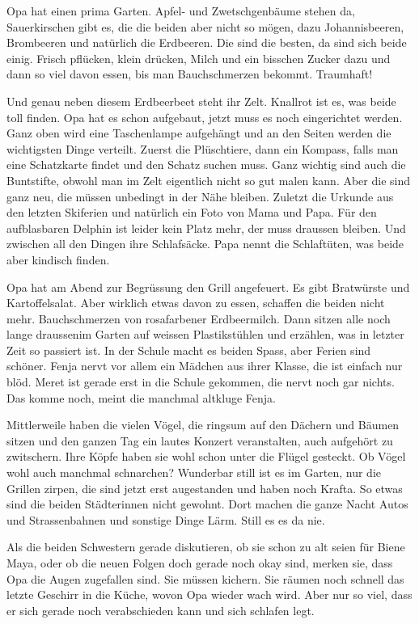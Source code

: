 Opa hat einen prima Garten. Apfel- und Zwetschgenbäume stehen da, Sauerkirschen gibt es, die die beiden aber nicht so mögen, dazu Johannisbeeren, Brombeeren und natürlich die Erdbeeren. Die sind die besten, da sind sich beide einig. Frisch pflücken, klein drücken, Milch und ein bisschen Zucker dazu und dann so viel davon essen, bis man Bauchschmerzen bekommt. Traumhaft!

Und genau neben diesem Erdbeerbeet steht ihr Zelt. Knallrot ist es, was beide toll finden. Opa hat es schon aufgebaut, jetzt muss es noch eingerichtet werden. Ganz oben wird eine Taschenlampe aufgehängt und an den Seiten werden die wichtigsten Dinge verteilt. Zuerst die Plüschtiere, dann ein Kompass, falls man eine Schatzkarte findet und den Schatz suchen muss. Ganz wichtig sind auch die Buntstifte, obwohl man im Zelt eigentlich nicht so gut malen kann. Aber die sind ganz neu, die müssen unbedingt in der Nähe bleiben. Zuletzt die Urkunde aus den letzten Skiferien und natürlich ein Foto von Mama und Papa. Für den aufblasbaren Delphin ist leider kein Platz mehr, der muss draussen bleiben. Und zwischen all den Dingen ihre Schlafsäcke. Papa nennt die Schlaftüten, was beide aber kindisch finden.

Opa hat am Abend zur Begrüssung den Grill angefeuert. Es gibt Bratwürste und Kartoffelsalat. Aber wirklich etwas davon zu essen, schaffen die beiden nicht mehr. Bauchschmerzen von rosafarbener Erdbeermilch. Dann sitzen alle noch lange draussenim Garten auf weissen Plastikstühlen und erzählen, was in letzter Zeit so passiert ist. In der Schule macht es beiden Spass, aber Ferien sind schöner. Fenja nervt vor allem ein Mädchen aus ihrer Klasse, die ist einfach nur blöd. Meret ist gerade erst in die Schule gekommen, die nervt noch gar nichts. Das komme noch, meint die manchmal altkluge Fenja.

Mittlerweile haben die vielen Vögel, die ringsum auf den Dächern und Bäumen sitzen und den ganzen Tag ein lautes Konzert veranstalten, auch aufgehört zu zwitschern. Ihre Köpfe haben sie wohl schon unter die Flügel gesteckt. Ob Vögel wohl auch manchmal schnarchen? Wunderbar still ist es im Garten, nur die Grillen zirpen, die sind jetzt erst augestanden und haben noch Krafta.  So etwas sind die beiden Städterinnen nicht gewohnt. Dort machen die ganze Nacht Autos und Strassenbahnen und sonstige Dinge Lärm. Still es es da nie. 

Als die beiden Schwestern gerade diskutieren, ob sie schon zu alt seien für Biene Maya, oder ob die neuen Folgen doch gerade noch okay sind, merken sie, dass Opa die Augen zugefallen sind. Sie müssen kichern. Sie räumen noch schnell das letzte Geschirr in die Küche, wovon Opa wieder wach wird. Aber nur so viel, dass er sich gerade noch verabschieden kann und sich schlafen legt.

